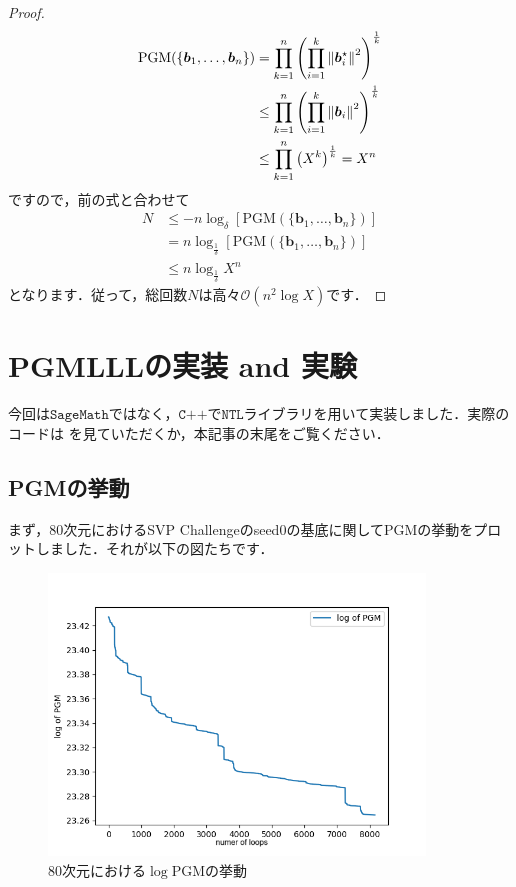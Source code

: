 \documentclass[a4j, dvipdfmx]{jsarticle}
\theoremstyle{definition}
\begin{document}
\begin{proof}
$$\begin{aligned}
    \mathrm{PGM}(\{\boldsymbol{b}_1,\ldots,\boldsymbol{b}_n\})&=\prod_{k=1}^{n}\left(\prod_{i=1}^{k} \norm{\boldsymbol{b}_i^\star}^2\right)^{\frac{1}{k}}\\
    &\le \prod_{k=1}^{n}\left(\prod_{i=1}^{k} \norm{\boldsymbol{b}_i}^2\right)^{\frac{1}{k}}\\
    &\le \prod_{k=1}^n \left(X^k\right)^\frac{1}{k}=X^n
    \end{aligned}
    $$
    ですので，前の式と合わせて
    $$
    \begin{aligned}
    N&\le -n\log_\delta\left[\mathrm{PGM}(\{\boldsymbol{b}_1,\ldots,\boldsymbol{b}_n\})\right]\\
    &=n\log_{\frac{1}{\delta}}\left[\mathrm{PGM}(\{\boldsymbol{b}_1,\ldots,\boldsymbol{b}_n\})\right]\\
    &\le n\log_\frac{1}{\delta} X^n
    \end{aligned}
    $$
    となります．従って，総回数$N$は高々$\mathcal{O}(n^2\log X)$です．
\end{proof}

\section{PGMLLLの実装 and 実験}

今回は$\texttt{SageMath}$ではなく，$\texttt{C++}$で$\texttt{NTL}$ライブラリを用いて実装しました．実際のコードは
を見ていただくか，本記事の末尾をご覧ください．
\subsection{PGMの挙動}

まず，80次元におけるSVP Challengeのseed0の基底に関してPGMの挙動をプロットしました．それが以下の図たちです．

\begin{figure}[H]
    \includegraphics[width=100mm]{80.png}
    \caption{$80$次元における$\log \mathrm{PGM}$の挙動}
\end{figure}
\end{document}
